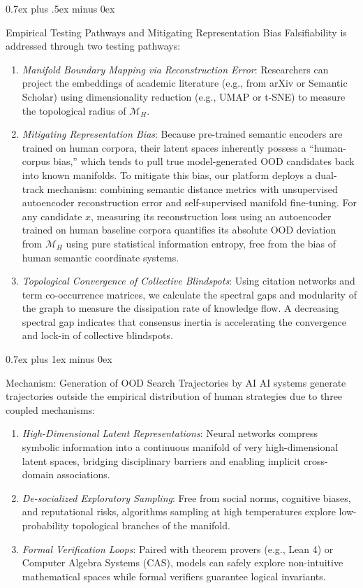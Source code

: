\documentclass[10pt,journal,compsoc]{IEEEtran}
\makeatletter
\renewcommand{\section}{\@startsection{section}{1}{\z@}{-3.5ex plus -2ex minus -1.5ex}%
{0.7ex plus 1ex minus 0ex}{\normalfont\sublargesize\sffamily\bfseries\scshape\raggedright}}
\renewcommand{\subsection}{\@startsection{subsection}{2}{\z@}{-3.5ex plus -1.5ex minus -1.5ex}%
{0.7ex plus .5ex minus 0ex}{\normalfont\normalsize\sffamily\bfseries\raggedright}}
\makeatother
\begin{document}
\subsection{Empirical Testing Pathways and Mitigating Representation Bias}
Falsifiability is addressed through two testing pathways:
\begin{enumerate}
\item \textit{Manifold Boundary Mapping via Reconstruction Error}: Researchers can project the embeddings of academic literature (e.g., from arXiv or Semantic Scholar) using dimensionality reduction (e.g., UMAP or t-SNE) to measure the topological radius of $\mathcal{M}_H$.
\item \textit{Mitigating Representation Bias}: Because pre-trained semantic encoders are trained on human corpora, their latent spaces inherently possess a ``human-corpus bias,'' which tends to pull true model-generated OOD candidates back into known manifolds. To mitigate this bias, our platform deploys a dual-track mechanism: combining semantic distance metrics with unsupervised autoencoder reconstruction error and self-supervised manifold fine-tuning. For any candidate $x$, measuring its reconstruction loss using an autoencoder trained on human baseline corpora quantifies its absolute OOD deviation from $\mathcal{M}_H$ using pure statistical information entropy, free from the bias of human semantic coordinate systems.
\item \textit{Topological Convergence of Collective Blindspots}: Using citation networks and term co-occurrence matrices, we calculate the spectral gaps and modularity of the graph to measure the dissipation rate of knowledge flow. A decreasing spectral gap indicates that consensus inertia is accelerating the convergence and lock-in of collective blindspots.
\end{enumerate}

\section{Mechanism: Generation of OOD Search Trajectories by AI}
AI systems generate trajectories outside the empirical distribution of human strategies due to three coupled mechanisms:
\begin{enumerate}
\item \textit{High-Dimensional Latent Representations}: Neural networks compress symbolic information into a continuous manifold of very high-dimensional latent spaces, bridging disciplinary barriers and enabling implicit cross-domain associations.
\item \textit{De-socialized Exploratory Sampling}: Free from social norms, cognitive biases, and reputational risks, algorithms sampling at high temperatures explore low-probability topological branches of the manifold.
\item \textit{Formal Verification Loops}: Paired with theorem provers (e.g., Lean 4) or Computer Algebra Systems (CAS), models can safely explore non-intuitive mathematical spaces while formal verifiers guarantee logical invariants.
\end{enumerate}
\end{document}
